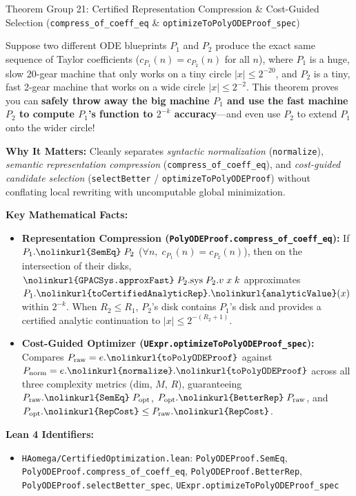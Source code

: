 \documentclass[11pt,a4paper]{article}
\newcommand{\lean}[1]{\texttt{\nolinkurl{#1}}}
\begin{document}
\vspace{6pt}

\begin{thmcard}{Theorem Group 21: Certified Representation Compression \& Cost-Guided Selection (\lean{compress\_of\_coeff\_eq} \& \lean{optimizeToPolyODEProof\_spec})}
\begin{eli5box}
Suppose two different ODE blueprints $P_1$ and $P_2$ produce the exact same sequence of Taylor coefficients ($c_{P_1}(n) = c_{P_2}(n)$ for all $n$), where $P_1$ is a huge, slow 20-gear machine that only works on a tiny circle $|x| \le 2^{-20}$, and $P_2$ is a tiny, fast 2-gear machine that works on a wide circle $|x| \le 2^{-2}$. This theorem proves you can \textbf{safely throw away the big machine $P_1$ and use the fast machine $P_2$ to compute $P_1$'s function to $2^{-k}$ accuracy}---and even use $P_2$ to extend $P_1$ onto the wider circle!
\end{eli5box}

\textbf{Why It Matters:}
Cleanly separates \emph{syntactic normalization} (\lean{normalize}), \emph{semantic representation compression} (\lean{compress_of_coeff_eq}), and \emph{cost-guided candidate selection} (\lean{selectBetter} / \lean{optimizeToPolyODEProof}) without conflating local rewriting with uncomputable global minimization.

\textbf{Key Mathematical Facts:}
\begin{itemize}
  \item \textbf{Representation Compression (\lean{PolyODEProof.compress_of_coeff_eq}):} If $P_1.\lean{SemEq}\;P_2$ ($\forall n,\; c_{P_1}(n) = c_{P_2}(n)$), then on the intersection of their disks, $\lean{GPACSys.approxFast}\;P_2.\mathrm{sys}\;P_2.v\;x\;k$ approximates $P_1.\lean{toCertifiedAnalyticRep}.\lean{analyticValue}(x)$ within $2^{-k}$. When $R_2 \le R_1$, $P_2$'s disk contains $P_1$'s disk and provides a certified analytic continuation to $|x| \le 2^{-(R_2+1)}$.
  \item \textbf{Cost-Guided Optimizer (\lean{UExpr.optimizeToPolyODEProof_spec}):} Compares $P_{\mathrm{raw}} = e.\lean{toPolyODEProof}$ against $P_{\mathrm{norm}} = e.\lean{normalize}.\lean{toPolyODEProof}$ across all three complexity metrics ($\mathrm{dim}$, $M$, $R$), guaranteeing $P_{\mathrm{raw}}.\lean{SemEq}\;P_{\mathrm{opt}}$, $P_{\mathrm{opt}}.\lean{BetterRep}\;P_{\mathrm{raw}}$, and $P_{\mathrm{opt}}.\lean{RepCost} \le P_{\mathrm{raw}}.\lean{RepCost}$.
\end{itemize}

\textbf{Lean 4 Identifiers:}
\begin{itemize}
  \item \lean{HAomega/CertifiedOptimization.lean}: \lean{PolyODEProof.SemEq}, \lean{PolyODEProof.compress_of_coeff_eq}, \lean{PolyODEProof.BetterRep}, \lean{PolyODEProof.selectBetter_spec}, \lean{UExpr.optimizeToPolyODEProof_spec}
\end{itemize}
\end{thmcard}
\end{document}
